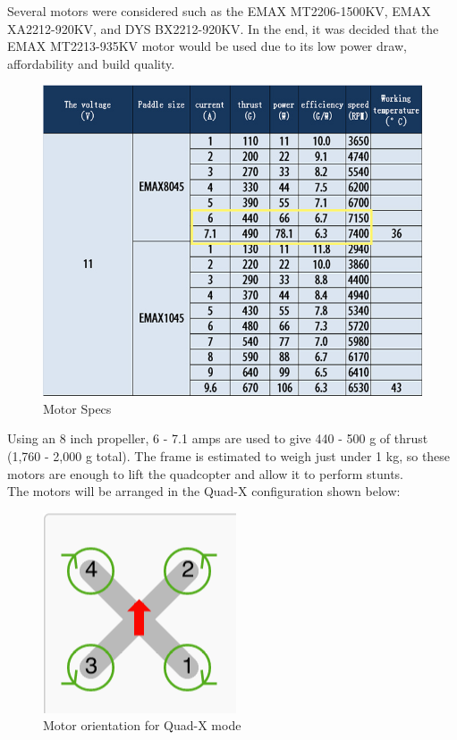 \documentclass[12pt]{article}
\begin{document}
Several motors were considered such as the EMAX MT2206-1500KV, EMAX XA2212-920KV, and DYS BX2212-920KV. In the end, it was decided that the EMAX MT2213-935KV motor would be used due to its low power draw, affordability and build quality.
\begin{figure}[!htb]
\caption{Motor Specs}
\centering
\includegraphics[scale=0.4]{motor_specs.png}
\end{figure}

Using an 8 inch propeller, 6 - 7.1 amps are used to give 440 - 500 g of thrust (1,760 - 2,000 g total). The frame is estimated to weigh just under 1 kg, so these motors are enough to lift the quadcopter and allow it to perform stunts.
\\


The motors will be arranged in the Quad-X configuration shown below:

\begin{figure}[!htb]
\caption{Motor orientation for Quad-X mode}
\centering
\includegraphics[scale=0.4]{quadx.png}
\end{figure}
\end{document}
